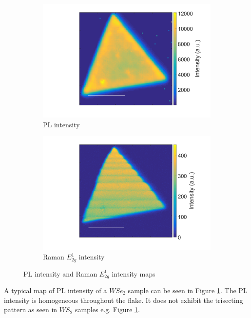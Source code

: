 \begin{figure}[!h]
	\begin{center}
		\begin{subfigure}[b]{0.35\textwidth}
			\includegraphics[scale=0.2]{WSe2/PLIntensity.png}
			\caption{PL intensity}
			\label{fig:WSe2PLIntensityMap}
		\end{subfigure}
		\qquad
		\begin{subfigure}[b]{0.35\textwidth}
			\includegraphics[scale=0.2]{WSe2/RamanEIntensity.png}
			\caption{Raman $E^1_{2g}$ intensity}
		\end{subfigure}
		\caption{PL intensity and Raman $E^1_{2g}$ intensity maps}
	\end{center}
\end{figure}

A typical map of PL intensity of a $WSe_2$ sample can be seen in Figure \ref{fig:WSe2PLIntensityMap}. The PL intensity is homogeneous throughout the flake. It does not exhibit the trisecting pattern as seen in $WS_2$ samples e.g. Figure \ref{fig:WSe2PLIntensityMap}.
	
